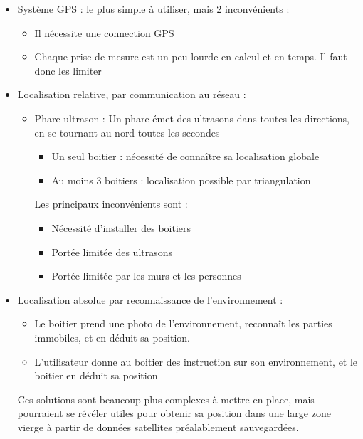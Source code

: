 \documentclass{article}
\begin{document}
\begin{itemize}
    \item Système GPS : le plus simple à utiliser, mais 2 inconvénients :
    \begin{itemize}
        \item Il nécessite une connection GPS
        \item Chaque prise de mesure est un peu lourde en calcul et en temps. Il faut donc les limiter
    \end{itemize}

    \item Localisation relative, par communication au réseau :
    \begin{itemize}
        \item Phare ultrason : Un phare émet des ultrasons dans toutes les directions, en se tournant au nord toutes les secondes
        \begin{itemize}
            \item Un seul boitier : nécessité de connaître sa localisation globale
            \item Au moins 3 boitiers : localisation possible par triangulation
        \end{itemize}
        Les principaux inconvénients sont :
        \begin{itemize}
            \item Nécessité d'installer des boitiers
            \item Portée limitée des ultrasons
            \item Portée limitée par les murs et les personnes
        \end{itemize}
    \end{itemize}

    \item Localisation absolue par reconnaissance de l'environnement :
    \begin{itemize}
        \item Le boitier prend une photo de l'environnement, reconnaît les parties immobiles, et en déduit sa position.
        \item L'utilisateur donne au boitier des instruction sur son environnement, et le boitier en déduit sa position
    \end{itemize}
    Ces solutions sont beaucoup plus complexes à mettre en place, mais pourraient se révéler utiles pour obtenir sa position dans une large zone vierge à partir de données satellites préalablement sauvegardées.
\end{itemize}
\end{document}
